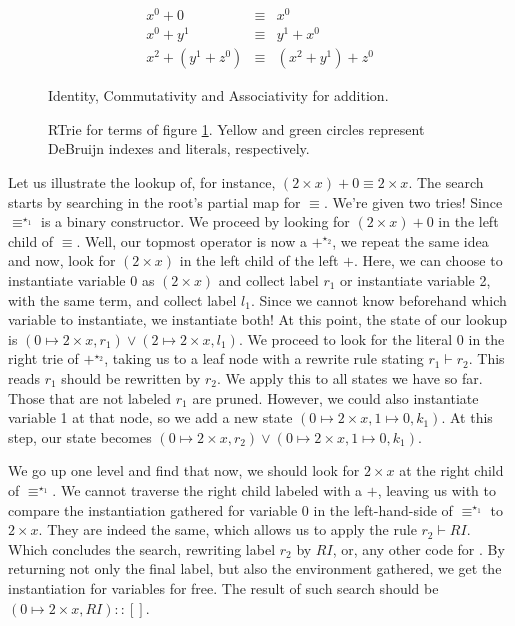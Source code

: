 \begin{figure}[h]
\begin{eqnarray*}
  x^0 + 0 & \equiv & x^0 \\
  x^0 + y^1 & \equiv & y^1 + x^0 \\
  x^2 + (y^1 + z^0) & \equiv & (x^2 + y^1) + z^0
\end{eqnarray*}
\caption{Identity, Commutativity and Associativity for addition.}
\label{fig:trie1terms}
\end{figure}

\begin{figure}[h]

\caption{RTrie for terms of figure \ref{fig:trie1terms}. Yellow and green circles represent DeBruijn indexes and literals, respectively.}
\label{fig:btrie1}
\end{figure}

Let us illustrate the lookup of, for instance, $(2 \times x) + 0 \equiv 2 \times x$.
The search starts by searching in the root's partial map for $\equiv$. We're given
two tries! Since $\equiv^{\star_1}$ is a binary constructor. We proceed by looking for $(2 \times x) + 0$
in the left child of $\equiv$. Well, our topmost operator is now a $+^{\star_2}$, we repeat the same idea and
now, look for $(2 \times x)$ in the left child of the left $+$. Here, we can choose
to instantiate variable 0 as $(2 \times x)$ and collect label $r_1$ or
instantiate variable 2, with the same term, and collect label $l_1$. Since we cannot know beforehand
which variable to instantiate, we instantiate both! At this point, the state of our lookup is
$(0 \mapsto 2 \times x , r_1) \vee (2 \mapsto 2 \times x , l_1)$.
We proceed to look for the literal $0$ in the right trie of $+^{\star_2}$, taking us to a leaf node with
a rewrite rule stating $r_1 \vdash r_2$. This reads $r_1$ should be rewritten by $r_2$. We apply
this to all states we have so far. Those that are not labeled $r_1$ are pruned. 
However, we could also instantiate variable 1 at that node, so
we add a new state $(0 \mapsto 2 \times x, 1 \mapsto 0 , k_1)$. At this step,
our state becomes $(0 \mapsto 2 \times x , r_2) \vee (0 \mapsto 2 \times x, 1 \mapsto 0 , k_1)$. 

We go up one level and find that
now, we should look for $2 \times x$ at the right child of $\equiv^{\star_1}$. We cannot traverse the
right child labeled with a $+$, leaving us with to compare the instantiation gathered for
variable 0 in the left-hand-side of $\equiv^{\star_1}$ to $2 \times x$. They are indeed the same,
which allows us to apply the rule $r_2 \vdash RI$. Which concludes the search, rewriting label $r_2$
by $RI$, or, any other code for . By returning not only the final label, but
also the environment gathered, we get the instantiation for variables for free.
The result of such search should be $(0 \mapsto 2 \times x , RI) :: []$.

